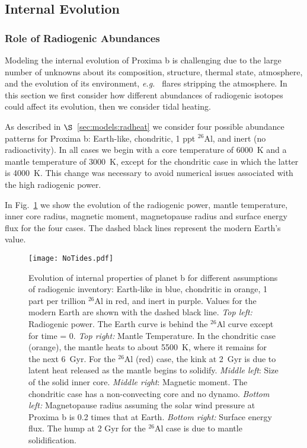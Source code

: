 \documentclass[preprint,12pt]{aastex}
\def\eg{{\it e.g.\ }}
\begin{document}
\subsection{Internal Evolution}
\label{sec:results:internal}

\subsubsection{Role of Radiogenic Abundances}

Modeling the internal evolution of Proxima b is challenging due to
 the large number of unknowns about its composition, 
structure, thermal state,
 atmosphere, and the evolution of its environment, \eg
flares stripping the atmosphere. In this section we first consider how
different abundances of radiogenic isotopes could affect its
evolution, then we consider tidal heating.

As described in $\S$~\ref{sec:models:radheat} we consider four
possible abundance patterns for Proxima b: Earth-like, chondritic, 1
ppt $^{26}$Al, and inert (no radioactivity). In all cases we begin with a core
temperature of 6000~K and a mantle temperature of 3000~K, except for
the chondritic case in which the latter is 4000~K. This change was
necessary 
to avoid numerical issues associated with the high
radiogenic power.

In Fig.~\ref{fig:notides} we show the evolution of the radiogenic
power, mantle temperature, inner core radius, magnetic moment,
magnetopause radius and surface energy flux for the four cases. The
dashed black lines represent the modern Earth's value.

\begin{figure} 
\begin{center}
\texttt{[image: NoTides.pdf]}
\end{center}
\caption{Evolution of internal properties of planet b for different
  assumptions of radiogenic inventory: Earth-like in blue, chondritic
  in orange, 1 part per trillion $^{26}$Al in red, and inert in
  purple. 
  Values for the modern Earth are shown with the dashed black
  line. {\it Top left:} Radiogenic power. The Earth curve is behind
  the $^{26}$Al curve except for time = 0. {\it Top right:} Mantle
  Temperature. In the chondritic case (orange), the mantle heats to
  about 5500~K, where it remains for the next 6~Gyr. For the $^{26}$Al
  (red) case, the kink at 2~Gyr is due to latent heat released as the
  mantle begins to solidify. {\it Middle left}: Size of the solid
  inner core. {\it Middle right}: Magnetic moment. The chondritic case
  has a non-convecting core and no dynamo. {\it Bottom
    left:} Magnetopause radius assuming the solar wind pressure at Proxima b is
  0.2 times that at Earth. {\it Bottom right:} Surface energy
  flux. The hump at 2 Gyr for the $^{26}$Al case is due to mantle
  solidification.}
\label{fig:notides}
\end{figure}
\end{document}
